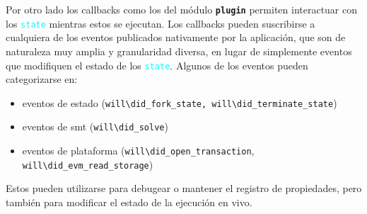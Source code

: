 Por otro lado los callbacks como los del módulo
\texttt{\textbf{plugin}} permiten interactuar con los \textcolor{cyan}{\texttt{state}} mientras estos se ejecutan.
Los callbacks pueden suscribirse a cualquiera de los eventos publicados nativamente por la aplicación, que son de naturaleza muy amplia y granularidad diversa, en lugar de simplemente eventos que modifiquen el estado de los \textcolor{cyan}{\texttt{state}}.
Algunos de los eventos pueden categorizarse en:
\begin{itemize}
    \item eventos de estado (\texttt{will\textbackslash did\_fork\_state, will\textbackslash did\_terminate\_state})
    \item eventos de smt (\texttt{will\textbackslash did\_solve})
    \item eventos de plataforma (\texttt{will\textbackslash did\_open\_transaction},\\ \texttt{will\textbackslash did\_evm\_read\_storage})
\end{itemize}
Estos pueden utilizarse para debugear o mantener el registro de propiedades, pero también para modificar el estado de la ejecución en vivo.


